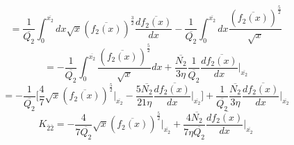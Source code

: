 \documentclass[fleqn, 10pt]{article}
\begin{document}
            \begin{equation*}
            = \frac{1}{\overline{Q_{2}}} \int^{\overline{x_{2}}}_{0} dx \sqrt{x} (\overline{f_{2}(x)})^\frac{3}{2} \frac{d\overline{f_{2}(x)}}{dx} - \frac{1}{\overline{Q_{2}}} \int^{\overline{x_{2}}}_{0} dx \frac{(\overline{f_{2}(x)})^\frac{5}{2}}{\sqrt{x}}
            \end{equation*}
            \begin{equation*}
            = - \frac{1}{\overline{Q_{2}}}\int^{\overline{x_{2}}}_{0}\frac{(\overline{f_{2}(x)})^\frac{5}{2}}{\sqrt{x}}dx + \frac{\overline{N_{2}}}{3\eta} \frac{1}{\overline{Q_{2}}}\frac{d\overline{f_{2}(x)}}{dx}\biggr|_{\overline{x_{2}}}
            \end{equation*}
            \begin{equation*}
            = - \frac{1}{\overline{Q_{2}}}   \biggl[ \frac{4}{7}\sqrt{x} (\overline{f_{2}(x)})^\frac{5}{2} \Bigg|_{\overline{x_{2}}} - \frac{5 \overline{N_{2}}}{21 \eta} \frac{d\overline{f_{2}(x)}}{dx}\biggr|_{\overline{x_{2}}}\biggr] + \frac{1}{\overline{Q_{2}}} \frac{\overline{N_{2}}}{3 \eta} \frac{d\overline{f_{2}(x)}}{dx} \biggr|_{\overline{x_{2}}}
            \end{equation*}
            \begin{equation}
            K_{\overline{2}\overline{2}} = -   \frac{4}{7\overline{Q_{2}}} \sqrt{x} (\overline{f_{2}(x)})^\frac{5}{2} \Bigg|_{\overline{x_{2}}} + \frac{4 \overline{N_{2}}}{7 \eta \overline{Q_{2}}} \frac{d\overline{f_{2}(x)}}{dx}\biggr|_{\overline{x_{2}}}
            \end{equation}
\end{document}
